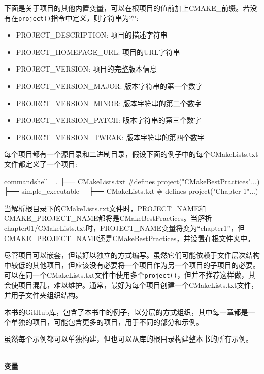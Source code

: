下面是关于项目的其他内置变量，可以在根项目的值前加上CMAKE\_前缀。若没有在\texttt{project()}指令中定义，则字符串为空:

\begin{itemize}
\item 
PROJECT\_DESCRIPTION: 项目的描述字符串

\item 
PROJECT\_HOMEPAGE\_URL: 项目的URL字符串

\item 
PROJECT\_VERSION: 项目的完整版本信息

\item 
PROJECT\_VERSION\_MAJOR: 版本字符串的第一个数字

\item 
PROJECT\_VERSION\_MINOR: 版本字符串的第二个数字

\item 
PROJECT\_VERSION\_PATCH: 版本字符串的第三个数字

\item 
PROJECT\_VERSION\_TWEAK: 版本字符串的第四个数字
\end{itemize}

每个项目都有一个源目录和二进制目录，假设下面的例子中的每个CMakeLists.txt文件都定义了一个项目:

\begin{tcblisting}{commandshell={}}
.
├── CMakeLists.txt #defines project("CMakeBestPractices"...)
├── simple_executable
│      ├── CMakeLists.txt # defines project("Chapter 1"...)
\end{tcblisting}

当解析根目录下的CMakeLists.txt文件时，PROJECT\_NAME和CMAKE\_PROJECT\_NAME都将是CMakeBestPractices。当解析chapter01/CMakeLists.txt时，PROJECT\_NAME变量将变为“chapter1”，但CMAKE\_PROJECT\_NAME还是CMakeBestPractices，并设置在根文件夹中。

尽管项目可以嵌套，但最好以独立的方式编写。虽然它们可能依赖于文件层次结构中较低的其他项目，但应该没有必要将一个项目作为另一个项目的子项目的必要。可以在同一个CMakeLists.txt文件中使用多个\texttt{project()}，但并不推荐这样做，其会使项目混乱，难以维护。通常，最好为每个项目创建一个CMakeLists.txt文件，并用子文件夹组织结构。

本书的GitHub库，包含了本书中的例子，以分层的方式组织，其中每一章都是一个单独的项目，可能包含更多的项目，用于不同的部分和示例。

虽然每个示例都可以单独构建，但也可以从库的根目录构建整本书的所有示例。

\hspace*{\fill} \\ %
\noindent
\textbf{变量}

